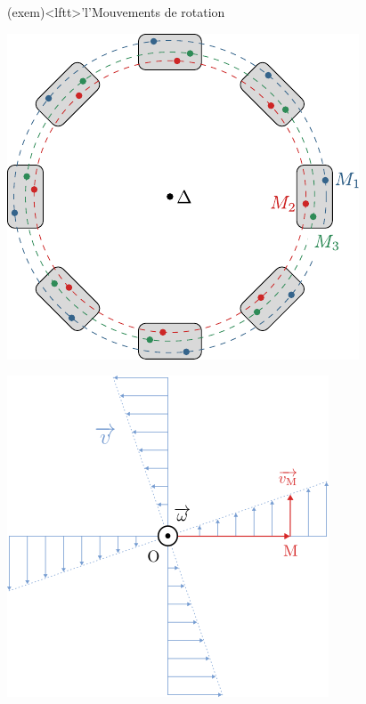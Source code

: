 \documentclass[../../main/main.tex]{subfiles}
\begin{document}
\begin{tcb*}(exem)<lftt>'l'{Mouvements de rotation}
	\begin{isd}
		\begin{center}
			\includegraphics[width=\linewidth]{rot_D}
		\end{center}
		\tcblower
		\begin{center}
			\includegraphics[width=\linewidth]{rot_dist.png}
		\end{center}
	\end{isd}
\end{tcb*}
\end{document}
